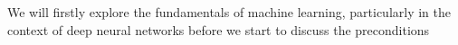 We will firstly explore the fundamentals of machine learning, particularly in the context of deep neural networks before we start to discuss the preconditions 
